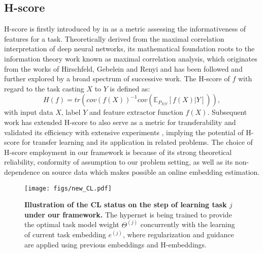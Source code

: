 \subsection{H-score}

H-score is firstly introduced by \citeauthor{huang2019information} in \citeyear{huang2019information} as a metric assessing the informativeness of features for a task. Theoretically derived from the maximal correlation interpretation of deep neural networks, its mathematical foundation roots to the information theory work known as maximal correlation analysis, which originates from the works of Hirschfeld, Gebelein and Renyi \citep{hirschfeld1935connection, gebelein1941statistische, renyi1959measures} and has been followed and further explored by a broad spectrum of successive work. The H-score of $f$ with regard to the task casting $X$ to $Y$ is defined as:
\begin{equation}
    H(f) = tr(cov(f(X))^{-1}cov(\mathbb{E}_{P_{X|Y}}[f(X)|Y])),
\label{singlehscore}
\end{equation}
with input data $X$, label $Y$ and feature extractor function $f(X)$.
Subsequent work has extended H-score to also serve as a metric for transferability and validated its efficiency with extensive experiments \citep{bao2019information, ibrahim2022newer}, implying the potential of H-score for transfer learning and its application in related problems.  The choice of H-score employment in our framework is because of its strong theoretical reliability, conformity of assumption to our problem setting, as well as its non-dependence on source data which makes possible an online embedding estimation. 

\begin{figure*}[htb]
    \centering
    \centerline{\texttt{[image: figs/new\_CL.pdf]}}
    \caption{\textbf{Illustration of the CL status on the step of learning task $j$ under our framework.} The hypernet is being trained to provide the optimal task model weight $\Theta^{(j)}$ concurrently with the learning of current task embedding $e^{(j)}$, where regularization and guidance are applied using previous embeddings and H-embeddings.} 
    \label{fig:CL}
\end{figure*}



